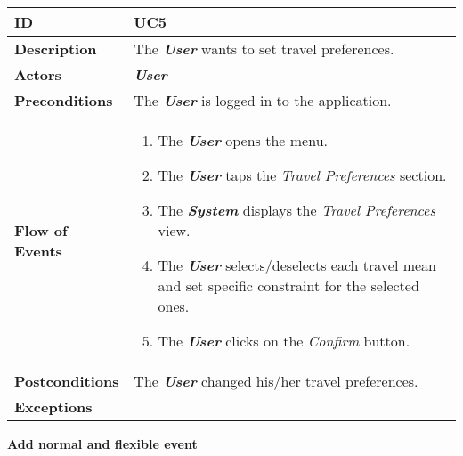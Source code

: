 \begin{tabularx}{\linewidth}{| l | X |}
	\hline
	\textbf{ID} & UC5\\
	
	\hline
	\textbf{Description} & The \textbf{\textit{User}} wants to set travel preferences.\\
	
	\hline
	\textbf{Actors} & \textbf{\textit{User}}\\
	
	\hline
	\textbf{Preconditions} & The \textbf{\textit{User}} is logged in to the application.\\
	
	\hline
	\textbf{Flow of Events} & \parbox{0.7\textwidth}{\begin{enumerate}
			\item The \textbf{\textit{User}} opens the menu.
			\item The \textbf{\textit{User}} taps the \textit{Travel Preferences} section.
			\item The \textbf{\textit{System}} displays the \textit{Travel Preferences} view.
			\item The \textbf{\textit{User}} selects/deselects each travel mean and set specific constraint for the selected ones.
			\item The \textbf{\textit{User}} clicks on the \textit{Confirm} button.
	\end{enumerate}}\\
	
	\hline
	\textbf{Postconditions} & The \textbf{\textit{User}} changed his/her travel preferences. \\
	
	\hline
	\textbf{Exceptions} & \parbox{0.7\textwidth}{}\\
	
	\hline
	
\end{tabularx}

\begin{center}
	\textbf{Add normal and flexible event}
\end{center}

